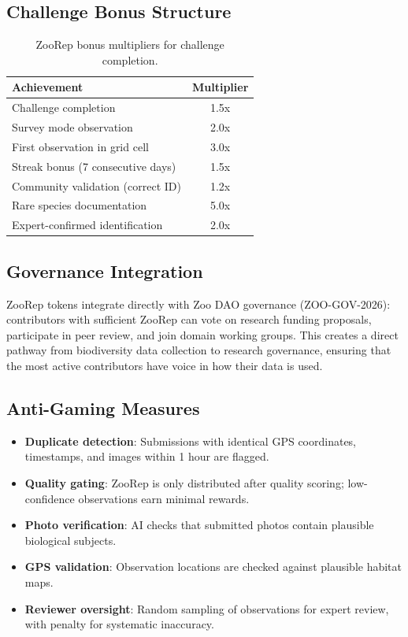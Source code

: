 \documentclass[11pt,a4paper]{article}
\begin{document}
\subsection{Challenge Bonus Structure}

\begin{table}[H]
\centering
\caption{ZooRep bonus multipliers for challenge completion.}
\label{tab:bonuses}
\begin{tabular}{lc}
\toprule
\textbf{Achievement} & \textbf{Multiplier} \\
\midrule
Challenge completion & 1.5x \\
Survey mode observation & 2.0x \\
First observation in grid cell & 3.0x \\
Streak bonus (7 consecutive days) & 1.5x \\
Community validation (correct ID) & 1.2x \\
Rare species documentation & 5.0x \\
Expert-confirmed identification & 2.0x \\
\bottomrule
\end{tabular}
\end{table}

\subsection{Governance Integration}

ZooRep tokens integrate directly with Zoo DAO governance (ZOO-GOV-2026):
contributors with sufficient ZooRep can vote on research funding
proposals, participate in peer review, and join domain working groups.
This creates a direct pathway from biodiversity data collection to
research governance, ensuring that the most active contributors have
voice in how their data is used.

\subsection{Anti-Gaming Measures}

\begin{itemize}
  \item \textbf{Duplicate detection}: Submissions with identical GPS
    coordinates, timestamps, and images within 1 hour are flagged.
  \item \textbf{Quality gating}: ZooRep is only distributed after
    quality scoring; low-confidence observations earn minimal rewards.
  \item \textbf{Photo verification}: AI checks that submitted photos
    contain plausible biological subjects.
  \item \textbf{GPS validation}: Observation locations are checked
    against plausible habitat maps.
  \item \textbf{Reviewer oversight}: Random sampling of observations
    for expert review, with penalty for systematic inaccuracy.
\end{itemize}
\end{document}
